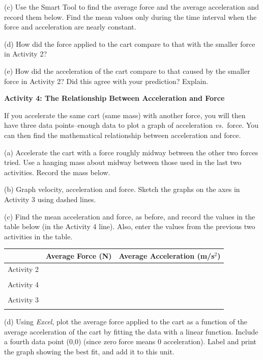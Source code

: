 (c) Use the Smart Tool to find the average force and the average acceleration
and record them below. Find the mean values only during the time interval when
the force and acceleration are nearly constant.
\answerspace{15mm}

(d) How did the force applied to the cart compare to that with the smaller force
in Activity 2?
\answerspace{15mm}

(e) How did the acceleration of the cart compare to that caused by the smaller
force in Activity 2? Did this agree with your prediction? Explain.
\answerspace{15mm}

\pagebreak[2]
\textbf{Activity 4: The Relationship Between Acceleration and Force }

If you accelerate the same cart (same mass) with another force, you will then
have three data points--enough data to plot a graph of acceleration \textit{vs.}~force.
You can then find the mathematical relationship between acceleration and force. 

(a) Accelerate the cart with a force roughly midway between the other two forces
tried. Use a hanging mass about midway between those used in the last two activities.
Record the mass below.
\answerspace{10mm}

(b) Graph velocity, acceleration and force. Sketch the graphs on the axes in
Activity 3 using dashed lines.

(c) Find the mean acceleration and force, as before, and record the values in
the table below (in the Activity 4 line). Also, enter the values from the previous two activities in the table.

\vspace{0.3cm}
{\centering \begin{tabular}{|c|c|c|}
\hline 
&
Average Force (N)&
Average Acceleration (m/s\( ^{2} \))\\
\hline 
Activity 2&
&
\\
&
&
\\
\hline 
Activity 4&
&
\\
&
&
\\
\hline 
Activity 3&
&
\\
&
&
\\
\hline 
\end{tabular}\par}
\vspace{0.3cm}

(d) Using \textit{Excel}, plot the average force applied to the cart as a function of the average acceleration of the cart by fitting the data with a linear function. Include a fourth data point (0,0) (since zero force means 0 acceleration). Label and print the graph showing the best fit, and add it to this unit.

